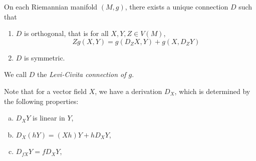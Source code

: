 \documentclass{article}
\begin{document}
\begin{theorem}
    On each Riemannian manifold \((M, g)\), there exists a unique connection \(D\) such that
    \begin{enumerate}
        \item \(D\) is orthogonal, that is for all \(X, Y, Z \in V(M)\),
        \[Zg(X, Y) = g(D_Z X, Y) + g(X, D_Z Y)\]
        \item \(D\) is symmetric.
    \end{enumerate}
    We call \(D\) the \emph{Levi-Civita connection of \(g\)}.
\end{theorem}

\lec

Note that for a vector field \(X\), we have a derivation \(D_X\), which is determined by the following properties:
\begin{enumerate}[(a)]
    \item \(D_XY\) is linear in \(Y\),
    \item \(D_X(hY) = (Xh)Y + h D_XY\),
    \item \(D_{fX}Y = fD_XY\),
\end{enumerate}
\end{document}

